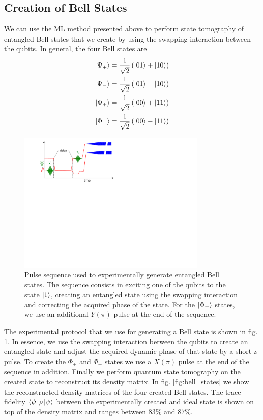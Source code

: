 \subsection{Creation of Bell States}

We can use the ML method presented above to perform state tomography of entangled Bell states that we create by using the swapping interaction between the qubits. In general, the four Bell states are
%
\begin{eqnarray}
\left| \Psi_+ \right> = \frac{1}{\sqrt{2}}\left(\left| 01 \right>+\left| 10 \right>\right) \\
\left| \Psi_- \right> = \frac{1}{\sqrt{2}}\left(\left| 01 \right>-\left| 10 \right>\right) \\
\left| \Phi_+ \right> = \frac{1}{\sqrt{2}}\left(\left| 00 \right>+\left| 11 \right>\right) \\
\left| \Phi_- \right> = \frac{1}{\sqrt{2}}\left(\left| 00 \right>-\left| 11 \right>\right)
\end{eqnarray}
%

\begin{figure}
	\centering
	\includegraphics[width=9cm]{"./material/figures/measurement/bell_state_creation"}
	\caption[]{Pulse sequence used to experimentally generate entangled Bell states. The sequence consists in exciting one of the qubits to the state $\left| 1 \right>$, creating an entangled state using the swapping interaction and correcting the acquired phase of the state. For the $\left| \Phi_\pm \right>$ states, we use an additional $Y(\pi)$ pulse at the end of the sequence.}
	\label{fig:bell_generation_pulse_sequence}
\end{figure}


The experimental protocol that we use for generating a Bell state is shown in fig. \ref{fig:bell_generation_pulse_sequence}. In essence, we use the swapping interaction between the qubits to create an entangled state and adjust the acquired dynamic phase of that state by a short z-pulse. To create the $\Phi_+$ and $\Phi_-$ states we use a $X(\pi)$ pulse at the end of the sequence in addition. Finally we perform quantum state tomography on the created state to reconstruct its density matrix. In fig. \ref{fig:bell_states} we show the reconstructed density matrices of the four created Bell states. The trace fidelity $\left< \psi \right|\rho\left| \psi \right>$ between the experimentally created and ideal state is shown on top of the density matrix and ranges between $83 \%$ and $87 \%$.

